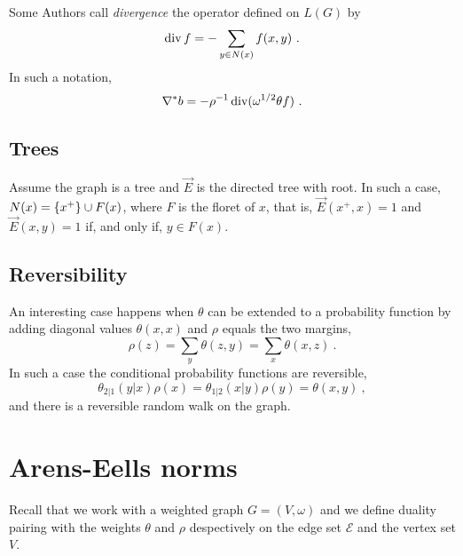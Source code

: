 \documentclass[12pt,a4paper]{amsart}
\begin{document}
Some Authors call \emph{divergence} the operator defined on $L(G)$ by
\begin{equation*}
  \Div f = - \sum_{y \in N(x)} f(x,y) \ .
\end{equation*}
In such a notation,
\begin{equation*}
  \nabla^* b = - \rho^{-1} \operatorname*{div}(\omega^{1/2} \theta f) \ . 
\end{equation*}


\subsection*{Trees} Assume the graph is a tree and $\overrightarrow
E$ is the directed tree with root. In such a case, $N(x) = \left\{x^+\right\}
\cup F(x)$, where $F$ is the floret of $x$, that is, $\overrightarrow E(x^+,x) =
1$ and $\overrightarrow E(x,y)=1$ if, and only if, $y \in F(x)$.

\subsection*{Reversibility} An interesting case happens when $\theta$
can be extended to a probability function by adding diagonal values
$\theta(x,x)$ and $\rho$ equals the two margins,
\begin{equation*}
  \rho(z) = \sum_y \theta(z,y) = \sum_x \theta(x,z) \ .
\end{equation*}
In such a case the conditional probability functions are reversible,
\begin{equation*}
  \theta_{2|1}(y|x) \rho(x) = \theta_{1|2}(x|y) \rho(y) = \theta(x,y) \ ,
\end{equation*}
and there is a reversible random walk on the graph.


\section{Arens-Eells norms}

Recall that we work with a weighted graph $G = (V,\omega)$ and we
define duality pairing with the weights $\theta$ and $\rho$
despectively on the edge set $\mathcal E$ and the vertex set $V$.
\end{document}
